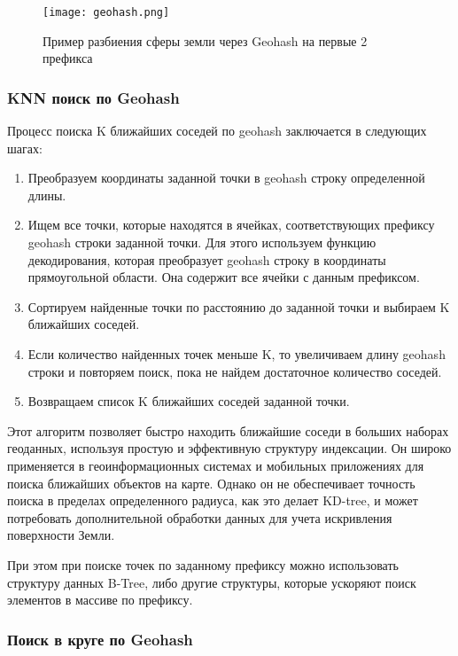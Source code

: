 \begin{figure}[h]
    \centering
    \texttt{[image: geohash.png]}
    \caption{Пример разбиения сферы земли через Geohash на первые 2 префикса}
\end{figure}

\subsubsection{KNN поиск по Geohash}
Процесс поиска K ближайших соседей по geohash заключается в следующих шагах:
\begin{enumerate}
    \item Преобразуем координаты заданной точки в geohash строку определенной длины.
    \item Ищем все точки, которые находятся в ячейках, соответствующих префиксу geohash строки заданной точки. Для этого используем функцию декодирования, которая преобразует geohash строку в координаты прямоугольной области. Она содержит все ячейки с данным префиксом.
    \item Сортируем найденные точки по расстоянию до заданной точки и выбираем K ближайших соседей.
    \item Если количество найденных точек меньше K, то увеличиваем длину geohash строки и повторяем поиск, пока не найдем достаточное количество соседей.
    \item Возвращаем список K ближайших соседей заданной точки.
\end{enumerate}

Этот алгоритм позволяет быстро находить ближайшие соседи в больших наборах геоданных, используя простую и эффективную структуру индексации. Он широко применяется в геоинформационных системах и мобильных приложениях для поиска ближайших объектов на карте. Однако он не обеспечивает точность поиска в пределах определенного радиуса, как это делает KD-tree, и может потребовать дополнительной обработки данных для учета искривления поверхности Земли.

При этом при поиске точек по заданному префиксу можно использовать структуру данных B-Tree, либо другие структуры, которые ускоряют поиск элементов в массиве по префиксу.

\subsubsection{Поиск в круге по Geohash}

